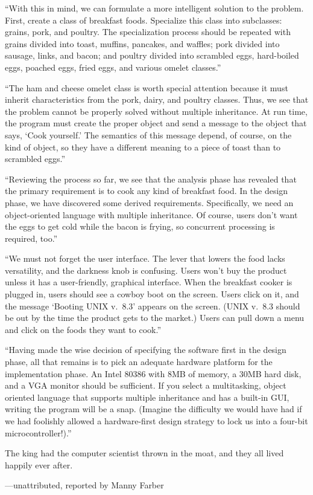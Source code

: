 \begin{bwslide}\small\em
{}

``With this in mind, we can formulate a more intelligent solution to
the problem.  First, create a class of breakfast foods. Specialize
this class into subclasses: grains, pork, and poultry.  The
specialization process should be repeated with grains divided into
toast, muffins, pancakes, and waffles; pork divided into sausage,
links, and bacon; and poultry divided into scrambled eggs, hard-boiled
eggs, poached eggs, fried eggs, and various omelet classes.''

``The ham and cheese omelet class is worth special attention because it
must inherit characteristics from the pork, dairy, and poultry
classes.  Thus, we see that the problem cannot be properly solved
without multiple inheritance.  At run time, the program must create
the proper object and send a message to the object that says, `Cook
yourself.'  The semantics of this message depend, of course, on the
kind of object, so they have a different meaning to a piece of toast
than to scrambled eggs.''

``Reviewing the process so far, we see that the analysis phase has
revealed that the primary requirement is to cook any kind of breakfast
food.  In the design phase, we have discovered some derived
requirements.  Specifically, we need an object-oriented language with
multiple inheritance.  Of course, users don't want the eggs to get
cold while the bacon is frying, so concurrent processing is required,
too.''

``We must not forget the user interface.  The lever that lowers the
food lacks versatility, and the darkness knob is confusing.  Users
won't buy the product unless it has a user-friendly, graphical
interface.  When the breakfast cooker is plugged in, users should see
a cowboy boot on the screen.  Users click on it, and the message
`Booting UNIX v.~8.3' appears on the screen. (UNIX v.~8.3 should be out
by the time the product gets to the market.)  Users can pull down a
menu and click on the foods they want to cook.''
\end{bwslide}


\begin{bwslide}\small\em
{}

``Having made the wise decision of specifying the software first in the design
phase, all that remains is to pick an adequate hardware platform for the
implementation phase.  An Intel 80386 with 8MB of memory, a 30MB hard disk, and
a VGA monitor should be sufficient.  If you select a multitasking, object
oriented language that supports multiple inheritance and has a built-in GUI,
writing the program will be a snap.  (Imagine the difficulty we would have had
if we had foolishly allowed a hardware-first design strategy to lock us into a
four-bit microcontroller!).''

The king had the computer scientist thrown in the moat, and they all lived
happily ever after.

\raggedright
---unattributed, reported by Manny Farber
\end{bwslide}


